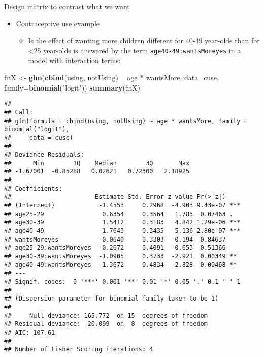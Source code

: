 \documentclass[
  ignorenonframetext,
]{beamer}
\newenvironment{Shaded}{\begin{snugshade}}{\end{snugshade}}
\newcommand{\DataTypeTok}[1]{\textcolor[rgb]{0.13,0.29,0.53}{#1}}
\newcommand{\KeywordTok}[1]{\textcolor[rgb]{0.13,0.29,0.53}{\textbf{#1}}}
\newcommand{\NormalTok}[1]{#1}
\newcommand{\OperatorTok}[1]{\textcolor[rgb]{0.81,0.36,0.00}{\textbf{#1}}}
\newcommand{\StringTok}[1]{\textcolor[rgb]{0.31,0.60,0.02}{#1}}
\providecommand{\tightlist}{%
  \setlength{\itemsep}{0pt}\setlength{\parskip}{0pt}}
\begin{document}
\begin{frame}[fragile]{Design matrix to contrast what we want}
\protect\hypertarget{design-matrix-to-contrast-what-we-want}{}

\begin{itemize}
\tightlist
\item
  Contraceptive use example

  \begin{itemize}
  \tightlist
  \item
    Is the effect of wanting more children different for 40-49 year-olds
    than for \textless25 year-olds is answered by the term
    \texttt{age40-49:wantsMoreyes} in a model with interaction terms:
  \end{itemize}
\end{itemize}

\begin{Shaded}
\begin{Highlighting}[]
\NormalTok{fitX <-}\StringTok{ }\KeywordTok{glm}\NormalTok{(}\KeywordTok{cbind}\NormalTok{(using, notUsing) }\OperatorTok{~}\StringTok{ }\NormalTok{age }\OperatorTok{*}\StringTok{ }\NormalTok{wantsMore, }
           \DataTypeTok{data=}\NormalTok{cuse, }\DataTypeTok{family=}\KeywordTok{binomial}\NormalTok{(}\StringTok{"logit"}\NormalTok{))}
\KeywordTok{summary}\NormalTok{(fitX)}
\end{Highlighting}
\end{Shaded}

\begin{verbatim}
## 
## Call:
## glm(formula = cbind(using, notUsing) ~ age * wantsMore, family = binomial("logit"), 
##     data = cuse)
## 
## Deviance Residuals: 
##      Min        1Q    Median        3Q       Max  
## -1.67001  -0.85288   0.02621   0.72300   2.18925  
## 
## Coefficients:
##                       Estimate Std. Error z value Pr(>|z|)    
## (Intercept)            -1.4553     0.2968  -4.903 9.43e-07 ***
## age25-29                0.6354     0.3564   1.783  0.07463 .  
## age30-39                1.5412     0.3183   4.842 1.29e-06 ***
## age40-49                1.7643     0.3435   5.136 2.80e-07 ***
## wantsMoreyes           -0.0640     0.3303  -0.194  0.84637    
## age25-29:wantsMoreyes  -0.2672     0.4091  -0.653  0.51366    
## age30-39:wantsMoreyes  -1.0905     0.3733  -2.921  0.00349 ** 
## age40-49:wantsMoreyes  -1.3672     0.4834  -2.828  0.00468 ** 
## ---
## Signif. codes:  0 '***' 0.001 '**' 0.01 '*' 0.05 '.' 0.1 ' ' 1
## 
## (Dispersion parameter for binomial family taken to be 1)
## 
##     Null deviance: 165.772  on 15  degrees of freedom
## Residual deviance:  20.099  on  8  degrees of freedom
## AIC: 107.61
## 
## Number of Fisher Scoring iterations: 4
\end{verbatim}

\end{frame}
\end{document}
